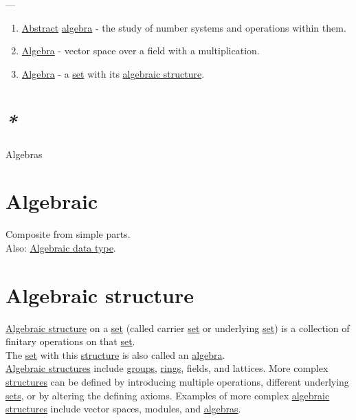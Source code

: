 \documentclass[a4paper,14pt,oneside]{book}
\begin{document}
---\\

\begin{enumerate}
\item \hyperref[orgb380e49]{Abstract} \hyperref[org7212e77]{algebra} - the study of number systems and operations within them.\\
\item \hyperref[org7212e77]{Algebra} - vector space over a field with a multiplication.\\
\item \hyperref[org7212e77]{Algebra} - a \hyperref[org297bd45]{set} with its \hyperref[org3ed395d]{algebraic structure}.\\
\end{enumerate}

\section{\emph{*}}
\label{sec:orgff43518}

\label{org76a2714}Algebras\\

\section{\label{org656481d}Algebraic}
\label{sec:orgf228150}
Composite from simple parts.\\
Also: \hyperref[orgc88dad0]{Algebraic data type}.\\

\section{\label{org3ed395d}Algebraic structure}
\label{sec:org50d45f6}
\hyperref[org3ed395d]{Algebraic structure} on a \hyperref[org297bd45]{set} (called carrier \hyperref[org297bd45]{set} or underlying \hyperref[org297bd45]{set}) is a collection of finitary operations on that \hyperref[org297bd45]{set}.\\
The \hyperref[org297bd45]{set} with this \hyperref[org04b27c9]{structure} is also called an \hyperref[org7212e77]{algebra}.\\

\hyperref[org69a8ddc]{Algebraic structures} include \hyperref[org071df7c]{groups}, \hyperref[org585da6e]{rings}, fields, and lattices. More complex \hyperref[org87ba85c]{structures} can be defined by introducing multiple operations, different underlying \hyperref[orgeb8f42e]{sets}, or by altering the defining axioms. Examples of more complex \hyperref[org69a8ddc]{algebraic structures} include vector spaces, modules, and \hyperref[org76a2714]{algebras}.\\
\end{document}
